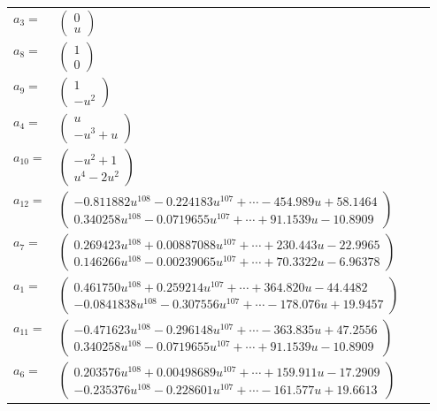 \documentclass[1p]{elsarticle_modified}
\theoremstyle{definition}
\begin{document}
\begin{tabular}{m{7pt} m{180pt} m{7pt} m{180pt} }
\flushright $a_{3}=$&$\begin{pmatrix}0\\u\end{pmatrix}$ \\
\flushright $a_{8}=$&$\begin{pmatrix}1\\0\end{pmatrix}$ \\
\flushright $a_{9}=$&$\begin{pmatrix}1\\- u^2\end{pmatrix}$ \\
\flushright $a_{4}=$&$\begin{pmatrix}u\\- u^3+u\end{pmatrix}$ \\
\flushright $a_{10}=$&$\begin{pmatrix}- u^2+1\\u^4-2 u^2\end{pmatrix}$ \\
\flushright $a_{12}=$&$\begin{pmatrix}-0.811882 u^{108}-0.224183 u^{107}+\cdots-454.989 u+58.1464\\0.340258 u^{108}-0.0719655 u^{107}+\cdots+91.1539 u-10.8909\end{pmatrix}$ \\
\flushright $a_{7}=$&$\begin{pmatrix}0.269423 u^{108}+0.00887088 u^{107}+\cdots+230.443 u-22.9965\\0.146266 u^{108}-0.00239065 u^{107}+\cdots+70.3322 u-6.96378\end{pmatrix}$ \\
\flushright $a_{1}=$&$\begin{pmatrix}0.461750 u^{108}+0.259214 u^{107}+\cdots+364.820 u-44.4482\\-0.0841838 u^{108}-0.307556 u^{107}+\cdots-178.076 u+19.9457\end{pmatrix}$ \\
\flushright $a_{11}=$&$\begin{pmatrix}-0.471623 u^{108}-0.296148 u^{107}+\cdots-363.835 u+47.2556\\0.340258 u^{108}-0.0719655 u^{107}+\cdots+91.1539 u-10.8909\end{pmatrix}$ \\
\flushright $a_{6}=$&$\begin{pmatrix}0.203576 u^{108}+0.00498689 u^{107}+\cdots+159.911 u-17.2909\\-0.235376 u^{108}-0.228601 u^{107}+\cdots-161.577 u+19.6613\end{pmatrix}$ \\

\end{tabular}
\end{document}

